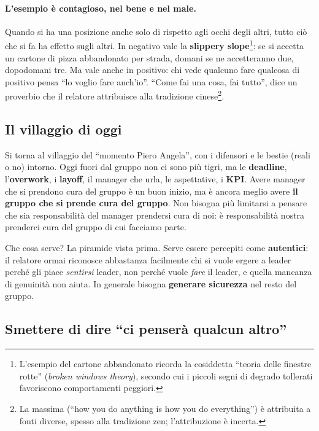 \paragraph{L'esempio è contagioso, nel bene e nel male.} Quando si ha una posizione anche solo di
rispetto agli occhi degli altri, tutto ciò che si fa ha effetto sugli altri. In negativo vale la
\textbf{slippery slope}\footnote{L'esempio del cartone abbandonato ricorda la cosiddetta ``teoria
delle finestre rotte'' (\emph{broken windows theory}), secondo cui i piccoli segni di degrado
tollerati favoriscono comportamenti peggiori.}: se si accetta un cartone di pizza abbandonato per
strada, domani se ne accetteranno due, dopodomani tre. Ma vale anche in positivo: chi vede qualcuno
fare qualcosa di positivo pensa ``lo voglio fare anch'io''. ``Come fai una cosa, fai tutto'', dice un
proverbio che il relatore attribuisce alla tradizione cinese\footnote{La massima (``how you do
anything is how you do everything'') è attribuita a fonti diverse, spesso alla tradizione zen;
l'attribuzione è incerta.}.

\subsection{Il villaggio di oggi}

Si torna al villaggio del ``momento Piero Angela'', con i difensori e le bestie (reali o no) intorno.
Oggi fuori dal gruppo non ci sono più tigri, ma le \textbf{deadline}, l'\textbf{overwork}, i
\textbf{layoff}, il manager che urla, le aspettative, i \textbf{KPI}. Avere manager che si prendono
cura del gruppo è un buon inizio, ma è ancora meglio avere \textbf{il gruppo che si prende cura del
gruppo}. Non bisogna più limitarsi a pensare che sia responsabilità del manager prendersi cura di
noi: è responsabilità nostra prenderci cura del gruppo di cui facciamo parte.

Che cosa serve? La piramide vista prima. Serve essere percepiti come \textbf{autentici}: il
relatore ormai riconosce abbastanza facilmente chi si vuole ergere a leader perché gli piace
\emph{sentirsi} leader, non perché vuole \emph{fare} il leader, e quella mancanza di genuinità non
aiuta. In generale bisogna \textbf{generare sicurezza} nel resto del gruppo.

\subsection{Smettere di dire ``ci penserà qualcun altro''}

